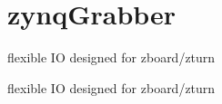 \hypertarget{group__zynqGrabber}{\section{zynq\-Grabber}
\label{group__zynqGrabber}
}


flexible I\-O designed for zboard/zturn  


flexible I\-O designed for zboard/zturn 